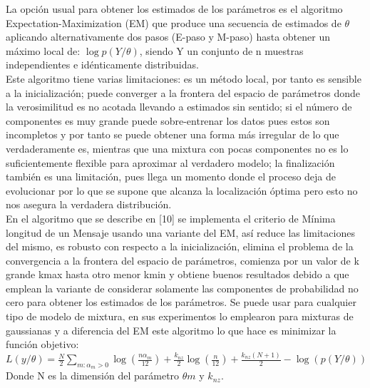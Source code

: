 La opción usual para obtener los estimados de los parámetros es el algoritmo Expectation-Maximization (EM) \cite{[FIGJA]} que produce una secuencia de estimados de $\theta$ aplicando alternativamente dos pasos (E-paso y M-paso) hasta obtener un máximo local de: $\log p(Y / \theta)$, siendo Y un conjunto de n muestras independientes e idénticamente distribuidas.\\
\hspace*{1cm}Este algoritmo tiene varias limitaciones: es un método local, por tanto es sensible a la inicialización; puede converger a la frontera del espacio de parámetros donde la verosimilitud es no acotada llevando a estimados sin sentido; si el número de componentes es muy grande puede sobre-entrenar los datos pues estos son incompletos y por tanto se puede obtener una forma más irregular de lo que verdaderamente es, mientras que una mixtura con pocas componentes no es lo suficientemente flexible para aproximar al verdadero modelo; la finalización también es una limitación, pues llega un momento donde el proceso deja de evolucionar por lo que se supone que alcanza la localización óptima pero esto no nos asegura la verdadera distribución.\\
\hspace*{1cm}En el algoritmo que se describe en [10] se implementa el criterio de Mínima longitud de un Mensaje usando una variante del EM, así reduce las limitaciones del mismo, es robusto con respecto a la inicialización, elimina el problema de la convergencia a la frontera del espacio de parámetros, comienza por un valor de k grande kmax hasta otro menor kmin y obtiene buenos resultados debido a que emplean la variante de considerar solamente las componentes de probabilidad no cero para obtener los estimados de los parámetros. Se puede usar para cualquier tipo de modelo de mixtura, en sus experimentos lo emplearon para mixturas de gaussianas y a diferencia del EM este algoritmo lo que hace es minimizar la función objetivo:\\
$L(y/\theta) = \frac{N}{2} \sum\limits_{m: \alpha_{m}>0} \log(\frac{n\alpha_{m}}{12}) + \frac{k_{nz}}{2} \log(\frac{n}{12})+ \frac{k_{nz}(N+1)}{2} -\log(p(Y / \theta)) $\\

Donde N es la dimensión del parámetro $\theta m$ y $k_{nz}$.
